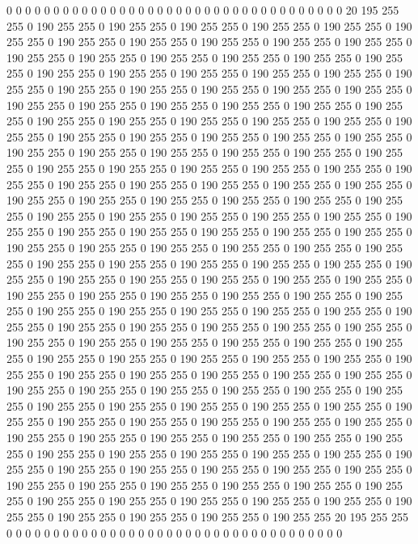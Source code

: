 0 0 0 0 0 0 0 0 0 0 0 0 0 0 0 0 0 0 0 0 0 0 0 0 0 0 0 0 0 0 0 0 0 0 0 0 20 195 255 255 0 190 255 255 0 190 255 255 0 190 255 255 0 190 255 255 0 190 255 255 0 190 255 255 0 190 255 255 0 190 255 255 0 190 255 255 0 190 255 255 0 190 255 255 0 190 255 255 0 190 255 255 0 190 255 255 0 190 255 255 0 190 255 255 0 190 255 255 0 190 255 255 0 190 255 255 0 190 255 255 0 190 255 255 0 190 255 255 0 190 255 255 0 190 255 255 0 190 255 255 0 190 255 255 0 190 255 255 0 190 255 255 0 190 255 255 0 190 255 255 0 190 255 255 0 190 255 255 0 190 255 255 0 190 255 255 0 190 255 255 0 190 255 255 0 190 255 255 0 190 255 255 0 190 255 255 0 190 255 255 
0 190 255 255 0 190 255 255 0 190 255 255 0 190 255 255 0 190 255 255 0 190 255 255 0 190 255 255 0 190 255 255 0 190 255 255 0 190 255 255 0 190 255 255 0 190 255 255 0 190 255 255 0 190 255 255 0 190 255 255 0 190 255 255 0 190 255 255 0 190 255 255 0 190 255 255 0 190 255 255 0 190 255 255 0 190 255 255 0 190 255 255 0 190 255 255 0 190 255 255 0 190 255 255 0 190 255 255 0 190 255 255 0 190 255 255 0 190 255 255 0 190 255 255 0 190 255 255 0 190 255 255 0 190 255 255 0 190 255 255 0 190 255 255 0 190 255 255 0 190 255 255 0 190 255 255 0 190 255 255 0 190 255 255 0 190 255 255 0 190 255 255 0 190 255 255 0 190 255 255 0 190 255 255 0 190 255 255 0 190 255 255 0 190 255 255 0 190 255 255 
0 190 255 255 0 190 255 255 0 190 255 255 0 190 255 255 0 190 255 255 0 190 255 255 0 190 255 255 0 190 255 255 0 190 255 255 0 190 255 255 0 190 255 255 0 190 255 255 0 190 255 255 0 190 255 255 0 190 255 255 0 190 255 255 0 190 255 255 0 190 255 255 0 190 255 255 0 190 255 255 0 190 255 255 0 190 255 255 0 190 255 255 0 190 255 255 0 190 255 255 0 190 255 255 0 190 255 255 0 190 255 255 0 190 255 255 0 190 255 255 0 190 255 255 0 190 255 255 0 190 255 255 0 190 255 255 0 190 255 255 0 190 255 255 0 190 255 255 0 190 255 255 0 190 255 255 0 190 255 255 0 190 255 255 0 190 255 255 0 190 255 255 0 190 255 255 0 190 255 255 0 190 255 255 0 190 255 255 0 190 255 255 0 190 255 255 0 190 255 255 
0 190 255 255 0 190 255 255 0 190 255 255 0 190 255 255 0 190 255 255 0 190 255 255 0 190 255 255 0 190 255 255 0 190 255 255 0 190 255 255 0 190 255 255 0 190 255 255 0 190 255 255 0 190 255 255 0 190 255 255 0 190 255 255 0 190 255 255 0 190 255 255 0 190 255 255 0 190 255 255 0 190 255 255 0 190 255 255 0 190 255 255 0 190 255 255 0 190 255 255 0 190 255 255 0 190 255 255 0 190 255 255 0 190 255 255 0 190 255 255 0 190 255 255 0 190 255 255 0 190 255 255 0 190 255 255 0 190 255 255 0 190 255 255 0 190 255 255 0 190 255 255 0 190 255 255 0 190 255 255 20 195 255 255 0 0 0 0 0 0 0 0 0 0 0 0 0 0 0 0 0 0 0 0 0 0 0 0 0 0 0 0 0 0 0 0 0 0 0 0 
